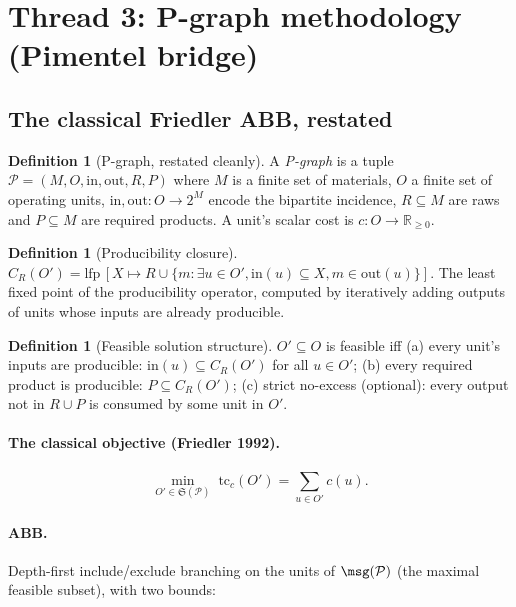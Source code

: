 \documentclass[11pt,a4paper]{article}
\theoremstyle{plain}
\theoremstyle{definition}
\newtheorem{definition}[theorem]{Definition}
\begin{document}
\section{Thread 3: P-graph methodology (Pimentel bridge)}

\subsection{The classical Friedler ABB, restated}

\begin{definition}[P-graph, restated cleanly]
A \emph{P-graph} is a tuple $\mathcal{P} = (M, O, \mathrm{in},
\mathrm{out}, R, P)$ where $M$ is a finite set of materials, $O$ a
finite set of operating units, $\mathrm{in}, \mathrm{out}: O \to
2^M$ encode the bipartite incidence, $R \subseteq M$ are raws and
$P \subseteq M$ are required products. A unit's scalar cost is
$c: O \to \mathbb{R}_{\geq 0}$.
\end{definition}

\begin{definition}[Producibility closure]
$C_R(O') = \mathrm{lfp}\,[X \mapsto R \cup \{m : \exists u \in O',
\mathrm{in}(u) \subseteq X, m \in \mathrm{out}(u)\}]$. The least
fixed point of the producibility operator, computed by iteratively
adding outputs of units whose inputs are already producible.
\end{definition}

\begin{definition}[Feasible solution structure]
$O' \subseteq O$ is feasible iff (a) every unit's inputs are
producible: $\mathrm{in}(u) \subseteq C_R(O')$ for all $u \in O'$;
(b) every required product is producible: $P \subseteq C_R(O')$;
(c) strict no-excess (optional): every output not in $R \cup P$ is
consumed by some unit in $O'$.
\end{definition}

\paragraph{The classical objective (Friedler 1992).}
\[
\min_{O' \in \mathfrak{S}(\mathcal{P})}\;
  \mathrm{tc}_c(O') = \sum_{u \in O'} c(u).
\]

\paragraph{ABB.} Depth-first include/exclude branching on the
units of $\msg(\mathcal{P})$ (the maximal feasible subset), with
two bounds:
\end{document}
